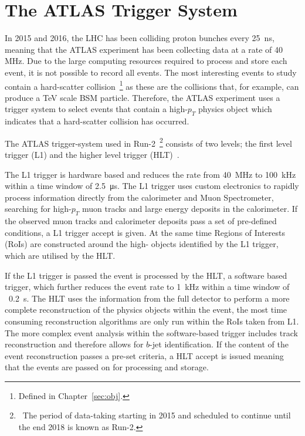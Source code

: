 \chapter{The ATLAS Trigger System}
\label{sec:trig}

In 2015 and 2016, the LHC has been colliding proton bunches every \SI{25}{\nano\second},
meaning that the ATLAS experiment has been collecting data at a rate of 40 MHz.
Due to the large computing resources required to process and store each event,
it is not possible to record all events.
The most interesting events to study contain a hard-scatter collision~\footnote{Defined in Chapter~\ref{sec:obj}.}
as these are the collisions that, for example, can produce a TeV scale BSM particle.
Therefore, the ATLAS experiment uses a trigger system to select events that 
contain a high-$p_{T}$ physics object which indicates that a hard-scatter collision has occurred.

The ATLAS trigger-system used in
Run-2~\footnote{\ The period of data-taking starting in 2015 and scheduled to continue until the end 2018 is known as Run-2.}
consists of two levels;
the first level trigger (L1) and the higher level trigger (HLT)~\cite{trig-run2_trigger,trig-run2_proc,trig-run2_triggerPerf}.
 
The L1 trigger is hardware based and reduces the rate from 40~MHz to 100~kHz within a time window of \SI{2.5}{\micro\second}.
The L1 trigger uses custom electronics to rapidly process information directly from the
calorimeter and Muon Spectrometer, searching for high-$p_{T}$ muon tracks and large energy deposits in the calorimeter.
If the observed muon tracks and calorimeter deposits pass a set of pre-defined conditions, a L1 trigger accept is given. 
At the same time Regions of Interests (RoIs) are constructed around the high-\pT{} objects identified by the L1 trigger, which are utilised by the HLT. 

If the L1 trigger is passed the event is processed by the HLT,
a software based trigger,
which further reduces the event rate to 1~kHz within a time window of ~\SI{0.2}{\second}.
The HLT uses the information from the full detector
to perform a more complete reconstruction of the physics objects within the event,
the most time consuming reconstruction algorithms are only run within the RoIs taken from L1.
The more complex event analysis within the software-based trigger includes
track reconstruction and therefore allows for \mbox{$b$-jet} \mbox{identification}.
If the content of the event reconstruction passes a pre-set criteria, a HLT accept is issued
meaning that the events are passed on for processing and storage. 

